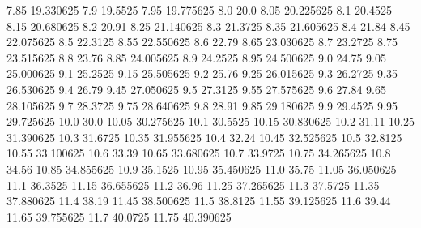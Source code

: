            7.85        19.330625
            7.9          19.5525
           7.95        19.775625
            8.0             20.0
           8.05        20.225625
            8.1          20.4525
           8.15        20.680625
            8.2            20.91
           8.25        21.140625
            8.3          21.3725
           8.35        21.605625
            8.4            21.84
           8.45        22.075625
            8.5          22.3125
           8.55        22.550625
            8.6            22.79
           8.65        23.030625
            8.7          23.2725
           8.75        23.515625
            8.8            23.76
           8.85        24.005625
            8.9          24.2525
           8.95        24.500625
            9.0            24.75
           9.05        25.000625
            9.1          25.2525
           9.15        25.505625
            9.2            25.76
           9.25        26.015625
            9.3          26.2725
           9.35        26.530625
            9.4            26.79
           9.45        27.050625
            9.5          27.3125
           9.55        27.575625
            9.6            27.84
           9.65        28.105625
            9.7          28.3725
           9.75        28.640625
            9.8            28.91
           9.85        29.180625
            9.9          29.4525
           9.95        29.725625
           10.0             30.0
          10.05        30.275625
           10.1          30.5525
          10.15        30.830625
           10.2            31.11
          10.25        31.390625
           10.3          31.6725
          10.35        31.955625
           10.4            32.24
          10.45        32.525625
           10.5          32.8125
          10.55        33.100625
           10.6            33.39
          10.65        33.680625
           10.7          33.9725
          10.75        34.265625
           10.8            34.56
          10.85        34.855625
           10.9          35.1525
          10.95        35.450625
           11.0            35.75
          11.05        36.050625
           11.1          36.3525
          11.15        36.655625
           11.2            36.96
          11.25        37.265625
           11.3          37.5725
          11.35        37.880625
           11.4            38.19
          11.45        38.500625
           11.5          38.8125
          11.55        39.125625
           11.6            39.44
          11.65        39.755625
           11.7          40.0725
          11.75        40.390625
